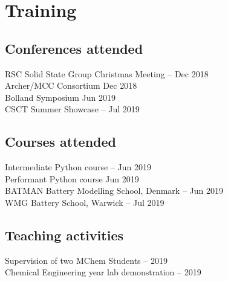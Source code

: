 \section*{Training}
\thispagestyle{plain}
\subsection*{Conferences attended}
RSC Solid State Group Christmas Meeting \dotfill {}-- Dec 2018\\
Archer/MCC Consortium \dotfill {} Dec 2018\\
Bolland Symposium \dotfill {} Jun 2019\\
CSCT Summer Showcase \dotfill {}-- Jul 2019

\subsection*{Courses attended}
Intermediate Python course \dotfill {}-- Jun 2019\\
Performant Python course \dotfill {} Jun 2019\\
BATMAN Battery Modelling School, Denmark \dotfill {}-- Jun 2019\\
WMG Battery School, Warwick \dotfill {}-- Jul 2019

\subsection*{Teaching activities}
Supervision of two MChem Students  -- 2019\\
Chemical Engineering  year lab demonstration  -- 2019\\